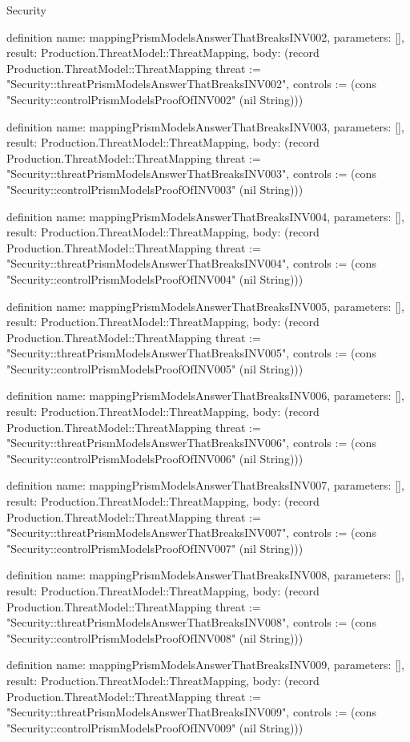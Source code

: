 \begin{lexlean}{Security}
\begin{semanticmodule}
definition{
  name: mappingPrismModelsAnswerThatBreaksINV002,
  parameters: [],
  result: Production.ThreatModel::ThreatMapping,
  body: (record Production.ThreatModel::ThreatMapping {threat := "Security::threatPrismModelsAnswerThatBreaksINV002", controls := (cons "Security::controlPrismModelsProofOfINV002" (nil String))})
}

definition{
  name: mappingPrismModelsAnswerThatBreaksINV003,
  parameters: [],
  result: Production.ThreatModel::ThreatMapping,
  body: (record Production.ThreatModel::ThreatMapping {threat := "Security::threatPrismModelsAnswerThatBreaksINV003", controls := (cons "Security::controlPrismModelsProofOfINV003" (nil String))})
}

definition{
  name: mappingPrismModelsAnswerThatBreaksINV004,
  parameters: [],
  result: Production.ThreatModel::ThreatMapping,
  body: (record Production.ThreatModel::ThreatMapping {threat := "Security::threatPrismModelsAnswerThatBreaksINV004", controls := (cons "Security::controlPrismModelsProofOfINV004" (nil String))})
}

definition{
  name: mappingPrismModelsAnswerThatBreaksINV005,
  parameters: [],
  result: Production.ThreatModel::ThreatMapping,
  body: (record Production.ThreatModel::ThreatMapping {threat := "Security::threatPrismModelsAnswerThatBreaksINV005", controls := (cons "Security::controlPrismModelsProofOfINV005" (nil String))})
}

definition{
  name: mappingPrismModelsAnswerThatBreaksINV006,
  parameters: [],
  result: Production.ThreatModel::ThreatMapping,
  body: (record Production.ThreatModel::ThreatMapping {threat := "Security::threatPrismModelsAnswerThatBreaksINV006", controls := (cons "Security::controlPrismModelsProofOfINV006" (nil String))})
}

definition{
  name: mappingPrismModelsAnswerThatBreaksINV007,
  parameters: [],
  result: Production.ThreatModel::ThreatMapping,
  body: (record Production.ThreatModel::ThreatMapping {threat := "Security::threatPrismModelsAnswerThatBreaksINV007", controls := (cons "Security::controlPrismModelsProofOfINV007" (nil String))})
}

definition{
  name: mappingPrismModelsAnswerThatBreaksINV008,
  parameters: [],
  result: Production.ThreatModel::ThreatMapping,
  body: (record Production.ThreatModel::ThreatMapping {threat := "Security::threatPrismModelsAnswerThatBreaksINV008", controls := (cons "Security::controlPrismModelsProofOfINV008" (nil String))})
}

definition{
  name: mappingPrismModelsAnswerThatBreaksINV009,
  parameters: [],
  result: Production.ThreatModel::ThreatMapping,
  body: (record Production.ThreatModel::ThreatMapping {threat := "Security::threatPrismModelsAnswerThatBreaksINV009", controls := (cons "Security::controlPrismModelsProofOfINV009" (nil String))})
}


\end{semanticmodule}
\end{lexlean}
